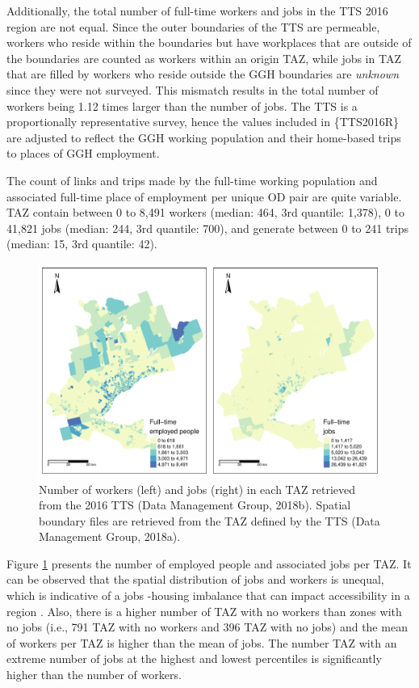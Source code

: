 \documentclass[Royal,times,sageh]{sagej}
\begin{document}
Additionally, the total number of full-time workers and jobs in the TTS
2016 region are not equal. Since the outer boundaries of the TTS are
permeable, workers who reside within the boundaries but have workplaces
that are outside of the boundaries are counted as workers within an
origin TAZ, while jobs in TAZ that are filled by workers who reside
outside the GGH boundaries are \emph{unknown} since they were not
surveyed. This mismatch results in the total number of workers being
1.12 times larger than the number of jobs. The TTS is a proportionally
representative survey, hence the values included in \{TTS2016R\} are
adjusted to reflect the GGH working population and their home-based
trips to places of GGH employment.

The count of links and trips made by the full-time working population
and associated full-time place of employment per unique OD pair are
quite variable. TAZ contain between 0 to 8,491 workers (median: 464, 3rd
quantile: 1,378), 0 to 41,821 jobs (median: 244, 3rd quantile: 700), and
generate between 0 to 241 trips (median: 15, 3rd quantile: 42).

\begin{figure}
\includegraphics[width=1\linewidth]{Manuscript-Data-Package_files/figure-latex/tts-workers-jobs-plot-1} \caption{\label{fig:tts-workers-jobs-plot}Number of workers (left) and jobs (right) in each TAZ retrieved from the 2016 TTS (Data Management Group, 2018b). Spatial boundary files are retrieved from the TAZ defined by the TTS (Data Management Group, 2018a).}\label{fig:tts-workers-jobs-plot}
\end{figure}

Figure \ref{fig:tts-workers-jobs-plot} presents the number of employed
people and associated jobs per TAZ. It can be observed that the spatial
distribution of jobs and workers is unequal, which is indicative of a
jobs -housing imbalance that can impact accessibility in a region
\citep{Levine1998rethinking}. Also, there is a higher number of TAZ with
no workers than zones with no jobs (i.e., 791 TAZ with no workers and
396 TAZ with no jobs) and the mean of workers per TAZ is higher than the
mean of jobs. The number TAZ with an extreme number of jobs at the
highest and lowest percentiles is significantly higher than the number
of workers.
\end{document}

